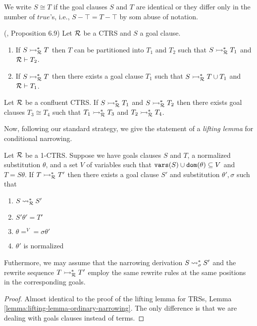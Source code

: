 We write $S \cong T$ if the goal clauses $S$ and $T$ are identical or they differ only in the number of $true$'s, i.e., $S - \top = T - \top$ by som abuse of notation.

\begin{proposition}(\cite{Middeldorp1994}, Proposition 6.9)
	Let $\mathcal{R}$ be a CTRS and $S$ a goal clause.
	\begin{enumerate}
		\item If $S \rightarrowtail^*_{\mathcal{R}} T$ then $T$ can be partitioned into $T_1$ and $T_2$ such that $S \rightarrowtail^*_{\mathcal{R}} T_1$ and $\mathcal{R} \vdash T_2$.
		\item If $S \rightarrowtail^*_{\mathcal{R}} T$ then there exists a goal clause $T_1$ such that $S \rightarrowtail^*_{\mathcal{R}} T \cup T_1$ and $\mathcal{R} \vdash T_1$.
	\end{enumerate}
\end{proposition}

\begin{lemma}
	Let $\mathcal{R}$ be a confluent CTRS. If $S \rightarrowtail^*_{\mathcal{R}} T_1$ and $S \rightarrowtail^*_{\mathcal{R}} T_2$ then there exists goal clauses $T_3 \cong T_4$ such that $T_1 \rightarrowtail^*_{\mathcal{R}} T_3$ and $T_2 \rightarrowtail^*_{\mathcal{R}} T_4$.
\end{lemma}

Now, following our standard strategy, we give the statement of a \textit{lifting lemma} for conditional narrowing.

\begin{lemma}\label{lemma:lifting-lemma-conditional-narrowing}
	Let $\mathcal{R}$ be a 1-CTRS. Suppose we have goals clauses $S$ and $T$, a normalized substitution $\theta$, and a set $V$ of variables such that $\mathtt{vars}(S) \cup \mathtt{dom}(\theta) \subseteq V$ and $T = S \theta$. If $T \rightarrowtail^*_{\mathcal{R}} T'$ then there exists a goal clause $S'$ and substitution $\theta', \sigma$ such that
	\begin{enumerate}
		\item $S \mathbin{\rightsquigarrow}^*_{\mathcal{R}} S'$
		\item $S'\theta' = T'$
		\item $\theta =^V = \sigma\theta'$
		\item $\theta'$ is normalized
	\end{enumerate}
	Futhermore, we may assume that the narrowing derivation $S \mathbin{\rightsquigarrow}^*_\sigma S'$ and the rewrite sequence $T \rightarrowtail^*_{\mathcal{R}} T'$ employ the same rewrite rules at the same positions in the corresponding goals.
	\begin{proof}
		Almost identical to the proof of the lifting lemma for TRSs, Lemma \ref{lemma:lifting-lemma-ordinary-narrowing}. The only difference is that we are dealing with goals clauses instead of terms.
	\end{proof}
\end{lemma}

